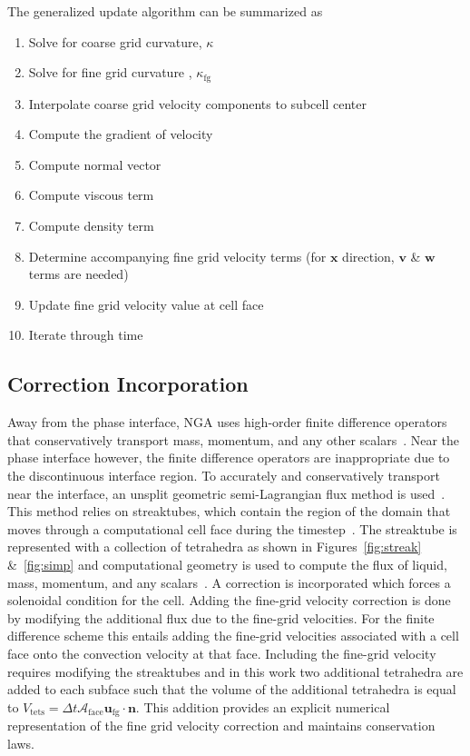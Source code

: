 The generalized update algorithm can be summarized as 
\begin{enumerate}
	\item Solve for coarse grid curvature, $\kappa$
	\item Solve for fine grid curvature , $\kappa_{\text{fg}}$
	\item Interpolate coarse grid velocity components to subcell center
	\item Compute the gradient of velocity
	\item Compute normal vector 
	\item Compute viscous term 
	\item Compute density term
	\item Determine accompanying fine grid velocity terms (for $\bm{x}$ direction, $\bm{v}$ \& $\bm{w}$ terms are needed) 
	\item Update fine grid velocity value at cell face
	\item Iterate through time
\end{enumerate}

\subsection*{Correction Incorporation} 
Away from the phase interface, NGA uses high-order finite difference operators that conservatively transport mass, momentum, and any other scalars~\cite{NGA2}.  Near the phase interface however, the finite difference operators are inappropriate due to the discontinuous interface region.  To accurately and conservatively transport near the interface, an unsplit geometric semi-Lagrangian flux method is used~\cite{Owkes2017,Owkes2014}. This method relies on streaktubes, which contain the region of the domain that moves through a computational cell face during the timestep~\cite{Owkes2017}.  The streaktube is represented with a collection of tetrahedra as shown in Figures~\ref{fig:streak} \&~\ref{fig:simp} and computational geometry is used to compute the flux of liquid, mass, momentum, and any scalars~\cite{Owkes2017}. A correction is incorporated which forces a solenoidal condition for the cell. Adding the fine-grid velocity correction is done by modifying the additional flux due to the fine-grid velocities. For the finite difference scheme this entails adding the fine-grid velocities associated with a cell face onto the convection velocity at that face. Including the fine-grid velocity requires modifying the streaktubes and in this work two additional tetrahedra are added to each subface such that the volume of the additional tetrahedra is equal to $V_\text{tets}=\Delta t \mathcal{A}_\text{face} \bm{u}_\text{fg}\cdot\bm{n}$. This addition provides an explicit numerical representation of the fine grid velocity correction and maintains conservation laws. 

